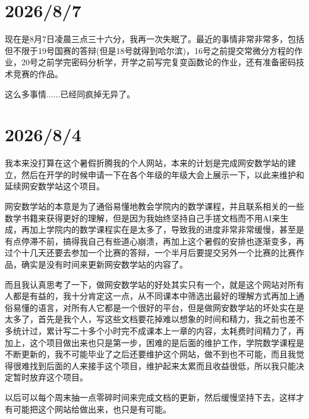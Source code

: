 

\section*{2026/8/7}

现在是8月7日凌晨三点三十六分，我再一次失眠了。最近的事情非常非常多，包括但不限于19号国赛的答辩(但是18号就得到哈尔滨)，16号之前提交常微分方程的作业，20号之前学完密码分析学，开学之前写完复变函数论的作业，还有准备密码技术竞赛的作品。

这么多事情......已经同疯掉无异了。


\section*{2026/8/4}

我本来没打算在这个暑假折腾我的个人网站，本来的计划是完成网安数学站的建立，然后在开学的时候申请一下在各个年级的年级大会上展示一下，以此来维护和延续网安数学站这个项目。

网安数学站的本意是为了通俗易懂地教会学院内的数学课程，并且联系相关的一些数学书籍来获得更好的理解，但是因为我始终坚持自己手搓文档而不用AI来生成，再加上学院内的数学课程实在是太多了，导致我的进度非常非常缓慢，甚至是有点停滞不前，搞得我自己有些道心崩溃，再加上这个暑假的安排也逐渐变多，再过个十几天还要去参加一个比赛的答辩，一个半月后要提交另外一个比赛的比赛作品，确实是没有时间来更新网安数学站的内容了。

而且我认真思考了一下，做网安数学站的好处其实只有一个，就是这个网站对所有人都是有益的，我十分肯定这一点，从不同课本中筛选出最好的理解方式再加上通俗易懂的语言，对所有人它都是一个很好的平台，但是做网安数学站的坏处实在是太多了，首先是我个人，写这些文档要花掉难以想象的时间和精力，我之前也差不多统计过，累计写二十多个小时完不成课本上一章的内容，太耗费时间精力了，再加上，这个项目做出来也只是第一步，困难的是后面的维护工作，学院数学课程是不断更新的，我不可能毕业了之后还要维护这个网站，做不到也不可能，而且我觉得很难找到后面的人来接手这个项目，维护起来太累而且收益很低，所以我只能决定暂时放弃这个项目。

以后可以每个周末抽一点零碎时间来完成文档的更新，然后缓慢坚持下去，这样才有可能把这个网站给做出来，也只是有可能。




